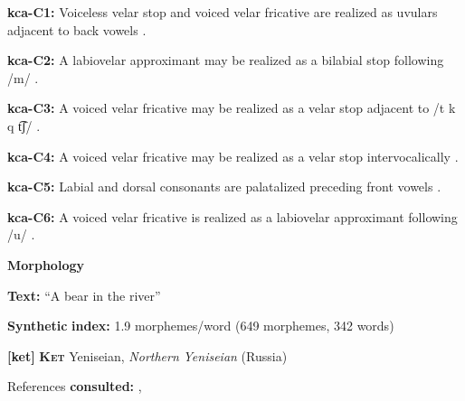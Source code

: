 \begin{styleBody}
\textbf{kca-C1:} Voiceless velar stop and voiced velar fricative are realized as uvulars adjacent to back vowels \citep[41]{Filchenko2007}.
\end{styleBody}

\begin{styleBody}
\textbf{kca-C2:} A labiovelar approximant may be realized as a bilabial stop following /m/ \citep[44-45]{Filchenko2007}.
\end{styleBody}

\begin{styleBody}
\textbf{kca-C3:} A voiced velar fricative may be realized as a velar stop adjacent to /t k q t͡ʃ/ \citep[45]{Filchenko2007}.
\end{styleBody}

\begin{styleBody}
\textbf{kca-C4:} A voiced velar fricative may be realized as a velar stop intervocalically \citep[45]{Filchenko2007}.
\end{styleBody}

\begin{styleBody}
\textbf{kca-C5:} Labial and dorsal consonants are palatalized preceding front vowels \citep[37]{Filchenko2007}.
\end{styleBody}

\begin{styleBody}
\textbf{kca-C6:} A voiced velar fricative is realized as a labiovelar approximant following /u/ \citep[45-6]{Filchenko2007}.
\end{styleBody}

\begin{styleBody}
\textbf{Morphology}
\end{styleBody}

\begin{styleBody}
\textbf{Text:} “A bear in the river” \citep[582-588]{Filchenko2007}
\end{styleBody}

\begin{styleBody}
\textbf{Synthetic} \textbf{index:} 1.9 morphemes/word (649 morphemes, 342 words)
\end{styleBody}

\begin{styleBody}
\textbf{[ket]}   \textbf{\textsc{Ket}}  Yeniseian, \textit{Northern} \textit{Yeniseian} (Russia)
\end{styleBody}

\begin{styleBody}
References \textbf{consulted:} \citet{Georg2007}, \citet{Vajda2000}
\end{styleBody}

